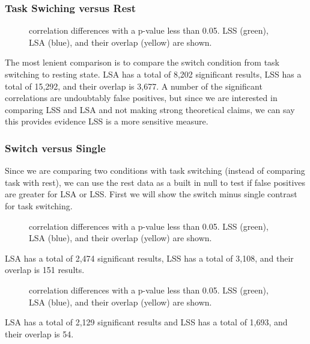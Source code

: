 \documentclass[10pt,letterpaper]{article}
\begin{document}
\subsubsection*{Task Swiching versus Rest}
\begin{figure}[H]
  \centering
  
  \caption{
    correlation differences with a p-value less than 0.05.
    LSS (green), LSA (blue), and their overlap (yellow) are shown.
  }
  \label{fig:taskvrest}
\end{figure}

The most lenient comparison is to compare the switch condition from task switching to resting state.
LSA has a total of 8,202 significant results, LSS has a total of 15,292,
and their overlap is 3,677.
A number of the significant correlations are undoubtably false positives, but
since we are interested in comparing LSS and LSA and not making strong theoretical claims,
we can say this provides evidence LSS is a more sensitive measure.

\subsubsection*{Switch versus Single}
Since we are comparing two conditions with task switching (instead of comparing task with rest),
we can use the rest data as a built in null to test if false positives are greater for LSA or LSS.
First we will show the switch minus single contrast for task switching.
\begin{figure}[H]
  \centering
  
  \caption{
    correlation differences with a p-value less than 0.05.
    LSS (green), LSA (blue), and their overlap (yellow) are shown.
  }
  \label{fig:switchvsingle}
\end{figure}
LSA has a total of 2,474 significant results, LSS has a total of 3,108,
and their overlap is 151 results.

\begin{figure}[H]
  \centering
  
  \caption{
    correlation differences with a p-value less than 0.05.
    LSS (green), LSA (blue), and their overlap (yellow) are shown.
  }
  \label{fig:restswitchvsingle}
\end{figure}
LSA has a total of 2,129 significant results and LSS has a total of 1,693,
and their overlap is 54.
\end{document}

